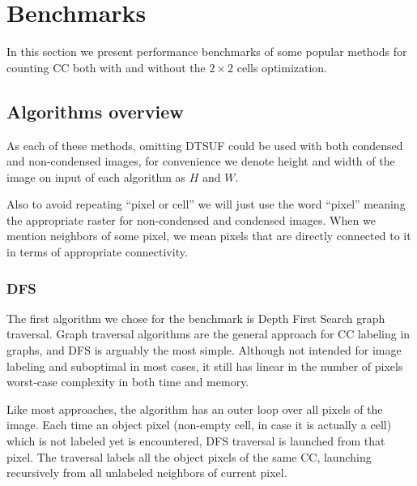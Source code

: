 \documentclass[hidelinks]{llncs}
\newcommand{\texten}[1]{#1}
\newcommand{\textru}[1]{}
\begin{document}
\section{Benchmarks}

In this section we present performance benchmarks of some popular methods for
counting CC both with and without the $2 \times 2$ cells optimization.

\subsection{Algorithms overview}

\texten{
As each of these methods, omitting DTSUF could be used with both condensed and
non-condensed images, for convenience we denote height and width of the image
on input of each algorithm as $H$ and $W$.
}\textru{
Так как все рассматриваемые методы, кроме DTSUF, можно применять как для сжатого,
так и для несжатого изображения, мы обозначим размеры входного изображения
каждого изображения за $H$ и $W$.
}

\texten{
Also to avoid repeating ``pixel or cell'' we will just use the word ``pixel''
meaning the appropriate raster for non-condensed and condensed images.
When we mention neighbors of some pixel, we mean pixels that are directly connected
to it in terms of appropriate connectivity.
}\textru{
По аналогии, чтобы избежать повторения ``пиксель или клетка'' мы будет просто
использовать слово ``пиксель'', имея в виду растр входного изображения.
Под соседями пикселя будем понимать пиксели, прямо связанные с ним в терминах
соответствующей связности.
}

\subsubsection{DFS}

The first algorithm we chose for the benchmark is Depth First Search graph traversal.
Graph traversal algorithms are the general approach for CC labeling in graphs, and
DFS is arguably the most simple.
Although not intended for image labeling and
suboptimal in most cases, it still has linear in the number of pixels worst-case
complexity in both time and memory.

Like most approaches, the algorithm has an outer loop over all pixels of the image.
Each time an object pixel (non-empty cell, in case it is actually a cell)
which is not labeled yet is encountered, DFS traversal is launched from that pixel.
The traversal labels all the object pixels of the same CC, launching recursively
from all unlabeled neighbors of current pixel.
\end{document}
